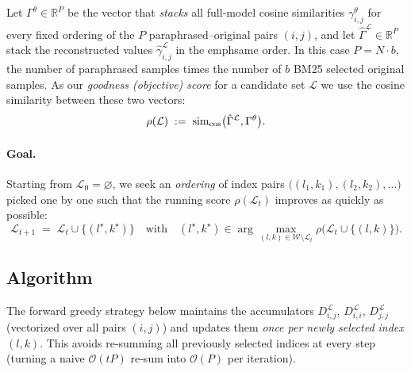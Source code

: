 Let $\Gamma^\theta \in \mathbb{R}^{P}$ be the vector that \emph{stacks} all full‑model cosine similarities $\gamma_{i,j}^{\theta}$ for every fixed ordering of the $P$ paraphrased–original pairs $(i,j)$, and let $\hat{\Gamma}^{\mathcal{L}} \in \mathbb{R}^{P}$ stack the reconstructed values $\hat{\gamma}^{\mathcal{L}}_{i,j}$ in the  emph{same} order. In this case $P = N \cdot b$, the number of paraphrased samples times the number of $b$ BM25 selected original samples. As our \emph{goodness (objective) score} for a candidate set $\mathcal{L}$ we use the cosine similarity between these two vectors:
\begin{equation}
\rho(\mathcal{L}) \;:=\;
\operatorname{sim}_{\cos}\bigl(\hat{\Gamma}^{\mathcal{L}}, \Gamma^\theta\bigr).
\label{eq:rho_objective}
\end{equation}

\paragraph{Goal.}
Starting from $\mathcal{L}_0=\varnothing$, we seek an \emph{ordering} of index pairs
$\bigl((l_1,k_1), (l_2,k_2), \dots\bigr)$ picked one by one such that the running score
$\rho(\mathcal{L}_t)$ improves as quickly as possible:
\[
\mathcal{L}_{t+1} \;=\; \mathcal{L}_t \cup \bigl\{(l^\star,k^\star)\bigr\}
\quad\text{with}\quad
(l^\star,k^\star) \in \arg\max_{(l,k)\in\mathcal{W}\setminus\mathcal{L}_t}
\rho\bigl(\mathcal{L}_t \cup \{(l,k)\}\bigr).
\]

\subsection{Algorithm}\label{ssec:gls_algo}
The forward greedy strategy below maintains the accumulators
$D^{\mathcal{L}}_{i,j}$, $D^{\mathcal{L}}_{i,i}$, $D^{\mathcal{L}}_{j,j}$ (vectorized over all pairs $(i,j)$) and
updates them \emph{once per newly selected index $(l,k)$}. This avoids re‑summing all previously
selected indices at every step (turning a naive $\mathcal{O}(tP)$ re‑sum into
$\mathcal{O}(P)$ per iteration).

